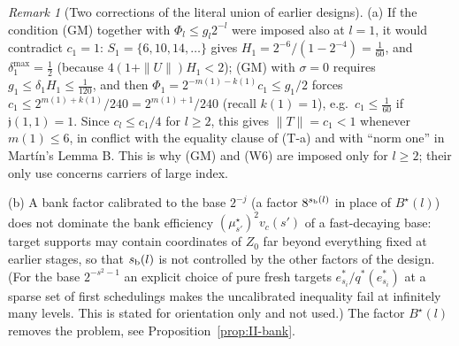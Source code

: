 \documentclass[10pt]{amsart}
\theoremstyle{definition}
\theoremstyle{remark}
\newtheorem{remark}[theorem]{Remark}
\begin{document}
\begin{remark}[Two corrections of the literal union of earlier designs]
\label{rem:II-corrections}
(a) If the condition (GM) together with $\Phi_l\le g_l2^{-l}$ were imposed
also at $l=1$, it would contradict $c_1=1$: $S_1=\{6,10,14,\dots\}$ gives
$H_1=2^{-6}/(1-2^{-4})=\frac1{60}$, and $\delta^{\max}_1=\frac12$
(because $4(1+\|U\|)H_1<2$); (GM) with $\sigma=0$ requires
$g_1\le\delta_1H_1\le\frac1{120}$, and then $\Phi_1=2^{-m(1)-k(1)}c_1\le
g_1/2$ forces $c_1\le2^{m(1)+k(1)}/240=2^{m(1)+1}/240$ (recall
$k(1)=1$), e.g.\ $c_1\le\frac1{60}$ if $\mathfrak j(1,1)=1$.  Since
$c_l\le c_1/4$ for $l\ge2$, this gives $\|T\|=c_1<1$ whenever
$m(1)\le6$, in conflict with the equality clause of (T-a) and with
``norm one'' in Mart\'in's Lemma B.  This is why
(GM) and (W6) are imposed only for $l\ge2$; their only use concerns
carriers of large index.

(b) A bank factor calibrated to the base $2^{-j}$ (a factor
$8^{s_{\rm b}(l)}$ in place of $B^\star(l)$) does not dominate the bank
efficiency $(\mu^\star_{s'})^2v_c(s')$ of a fast-decaying base: target
supports may contain coordinates of $Z_0$ far beyond everything fixed at
earlier stages, so that $s_{\rm b}(l)$ is not controlled by the other
factors of the design.  (For the base $2^{-s^2-1}$ an explicit choice of
pure fresh targets $e_{s_i}^*/q^*(e_{s_i}^*)$ at a sparse set of first
schedulings makes the uncalibrated inequality fail at infinitely many
levels.  This is stated for orientation only and not used.)  The factor
$B^\star(l)$ removes the problem, see
Proposition~\ref{prop:II-bank}.
\end{remark}
\end{document}
